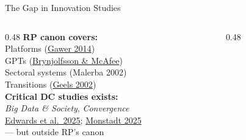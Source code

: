 \documentclass[aspectratio=169,11pt]{beamer}
\newcommand{\iconfull}[2]{\textcolor{#1}{\faIcon{#2}}}
\begin{document}
\begin{frame}{\iconfull{dcblue}{search}\enspace The Gap in Innovation Studies}
\begin{columns}[T]
\begin{column}{0.48\textwidth}
  \small\textbf{RP canon covers:}\\[0.3em]
  \footnotesize
  Platforms (\href{https://doi.org/10.1016/j.respol.2014.03.006}{Gawer 2014})\\
  GPTs (\href{https://www.nber.org/papers/w22064}{Brynjolfsson \& McAfee})\\
  Sectoral systems (Malerba 2002)\\
  Transitions (\href{https://doi.org/10.1016/S0048-7333(02)00062-8}{Geels 2002})\\[0.5em]
  \small\textbf{Critical DC studies exists:}\\[0.3em]
  \footnotesize
  \textit{Big Data \& Society}, \textit{Convergence}\\
  \href{https://doi.org/10.1177/13548565231224157}{Edwards et al.\ 2025}; \href{https://doi.org/10.1111/1468-2427.13316}{Monstadt 2025}\\
  — but outside RP's canon
\end{column}
\begin{column}{0.48\textwidth}
  \vspace{0.3em}
\end{column}
\end{columns}
\end{frame}
\end{document}
